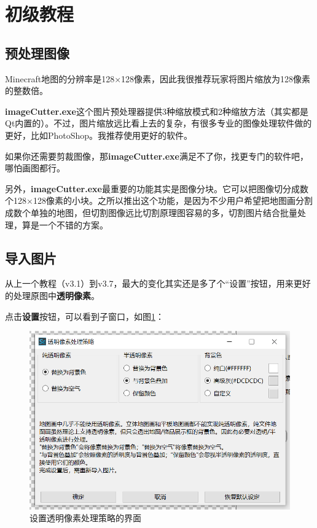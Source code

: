\documentclass[UTF8]{ctexart}
\begin{document}
    \pagebreak
    \section{初级教程}
    \subsection{预处理图像}
    Minecraft地图的分辨率是128×128像素，因此我很推荐玩家将图片缩放为128像素的整数倍。

    \textbf{imageCutter.exe}这个图片预处理器提供3种缩放模式和2种缩放方法（其实都是Qt内置的）。不过，图片缩放远比看上去的复杂，有很多专业的图像处理软件做的更好，比如PhotoShop。我推荐使用更好的软件。

    如果你还需要剪裁图像，那\textbf{imageCutter.exe}满足不了你，找更专门的软件吧，哪怕画图都行。

    另外，\textbf{imageCutter.exe}最重要的功能其实是图像分块。它可以把图像切分成数个128×128像素的小块。之所以推出这个功能，是因为不少用户希望把地图画分割成数个单独的地图，但切割图像远比切割原理图容易的多，切割图片结合批量处理，算是一个不错的方案。

    \subsection{导入图片}
    从上一个教程（v3.1）到v3.7，最大的变化其实还是多了个“设置”按钮，用来更好的处理原图中\textbf{透明像素}。
 
    点击\textbf{设置}按钮，可以看到子窗口，如图\ref*{SetTPS}：

    \begin{figure}[htbp]
        \centering
        \includegraphics[width=15cm]{Img1_TPS.png}
        \caption{设置透明像素处理策略的界面}
        \label{SetTPS}
    \end{figure}
    
\end{document}
